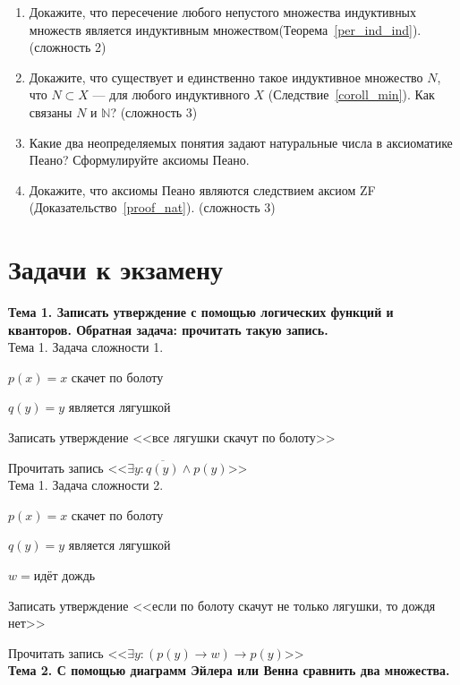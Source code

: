 \documentclass[12pt,oneside]{article}
\theoremstyle{definition}
\begin{document}
\begin{enumerate}
\item Докажите, что пересечение любого непустого множества индуктивных множеств является индуктивным множеством(Теорема~\ref{per_ind_ind}).(сложность 2)

\item Докажите, что существует и единственно такое индуктивное множество $N$, что $N\subset X$ --- для любого индуктивного $X$ (Следствие~\ref{coroll_min}). Как связаны $N$ и $\mathbb{N}$? (сложность 3)

\item Какие два неопределяемых понятия задают натуральные числа в аксиоматике Пеано? Сформулируйте аксиомы Пеано. 

\item Докажите, что аксиомы Пеано являются следствием аксиом  ZF (Доказательство~\ref{proof_nat}). (сложность 3) 
\end{enumerate}


\newpage
\section{Задачи к экзамену}


{\bf Тема 1. Записать утверждение с помощью логических функций и кванторов. Обратная задача: прочитать такую запись.}\\


Тема 1. Задача сложности 1.

$p(x)=x$ скачет по болоту

$q(y)=y$ является лягушкой

Записать утверждение <<все лягушки скачут по болоту>>

Прочитать запись <<$\exists y:\overline{q(y)}\wedge p(y)$>>\\

Тема 1. Задача сложности 2.

$p(x)=x$ скачет по болоту

$q(y)=y$ является лягушкой

$w=$идёт дождь

Записать утверждение <<если по болоту скачут не только лягушки, то дождя нет>>

Прочитать запись <<$\exists y:(p(y)\rightarrow w)\rightarrow p(y)$>>\\





{\bf Тема 2. С помощью диаграмм Эйлера или Венна сравнить два множества.}\\
\end{document}
